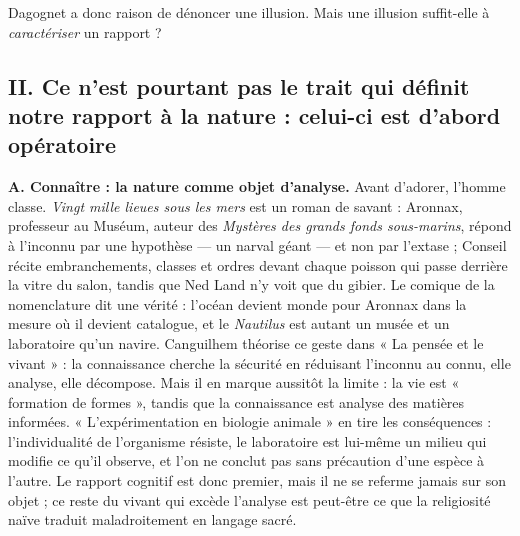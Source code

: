 \documentclass[11pt,a4paper]{article}
\begin{document}
Dagognet a donc raison de dénoncer une illusion. Mais une illusion suffit-elle à \emph{caractériser} un rapport ?

\hypertarget{ii.-ce-nest-pourtant-pas-le-trait-qui-duxe9finit-notre-rapport-uxe0-la-nature-celui-ci-est-dabord-opuxe9ratoire}{%
\subsection{II. Ce n'est pourtant pas le trait qui définit notre rapport à la nature : celui-ci est d'abord opératoire}\label{ii.-ce-nest-pourtant-pas-le-trait-qui-duxe9finit-notre-rapport-uxe0-la-nature-celui-ci-est-dabord-opuxe9ratoire}}

\textbf{A. Connaître : la nature comme objet d'analyse.} Avant d'adorer, l'homme classe. \emph{Vingt mille lieues sous les mers} est un roman de savant : Aronnax, professeur au Muséum, auteur des \emph{Mystères des grands fonds sous-marins}, répond à l'inconnu par une hypothèse --- un narval géant --- et non par l'extase ; Conseil récite embranchements, classes et ordres devant chaque poisson qui passe derrière la vitre du salon, tandis que Ned Land n'y voit que du gibier. Le comique de la nomenclature dit une vérité : l'océan devient monde pour Aronnax dans la mesure où il devient catalogue, et le \emph{Nautilus} est autant un musée et un laboratoire qu'un navire. Canguilhem théorise ce geste dans « La pensée et le vivant » : la connaissance cherche la sécurité en réduisant l'inconnu au connu, elle analyse, elle décompose. Mais il en marque aussitôt la limite : la vie est « formation de formes », tandis que la connaissance est analyse des matières informées. « L'expérimentation en biologie animale » en tire les conséquences : l'individualité de l'organisme résiste, le laboratoire est lui-même un milieu qui modifie ce qu'il observe, et l'on ne conclut pas sans précaution d'une espèce à l'autre. Le rapport cognitif est donc premier, mais il ne se referme jamais sur son objet ; ce reste du vivant qui excède l'analyse est peut-être ce que la religiosité naïve traduit maladroitement en langage sacré.
\end{document}
